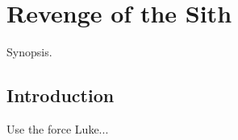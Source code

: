 
\chapter{Revenge of the Sith}
	\label{chapter:revenge-of-sith}%



\begin{synopsis}
	Synopsis.
\end{synopsis}


\section{Introduction}

Use the force Luke...


